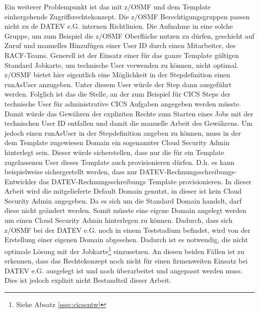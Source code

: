 Ein weiterer Problempunkt ist das mit z/OSMF und dem Template einhergehende Zugriffsrechtekonzept.
Die z/OSMF Berechtigungsgruppen passen nicht zu de DATEV e.G. internen Richtlinien.
Die Aufnahme in eine solche Gruppe, um zum Beispiel die z/OSMF Oberfläche nutzen zu dürfen, geschieht auf Zuruf und manuelles Hinzufügen einer User ID durch einen Mitarbeiter, des RACF-Teams.
Generell ist der Einsatz einer für das ganze Template gültigen Standard Jobkarte, um technische User verwenden zu können, nicht optimal.
z/OSMF bietet hier eigentlich eine Möglichkeit in der Stepdefinition einen \glqq runAsUser\grqq{} anzugeben.
Unter diesem User würde der Step dann ausgeführt werden.
Folglich ist das die Stelle, an der zum Beispiel für CICS Steps der technische User für administrative CICS Aufgaben angegeben werden müsste.
Damit würde das Gewähren der expliziten Rechte zum Starten eines Jobs mit der technischen User ID entfallen und damit die manuelle Arbeit des \glqq Gewährens\grqq.
Um jedoch  einen \glqq runAsUser\grqq{} in der Stepdefinition angeben zu können, muss in der dem Template zugewiesen \glqq Domain\grqq{} ein sogenannter \glqq Cloud Security Admin\grqq{} hinterlegt sein.
Dieser würde sicherstellen, dass nur die für ein Template zugelassenen User dieses Template auch provisionieren dürfen.
D.h. es kann beispielweise sichergestellt werden, dass nur DATEV-Rechnungsschreibungs-Entwickler das DATEV-Rechnungsschreibungs Template provisionieren.
In dieser Arbeit wird die mitgelieferte \glqq Default Domain\grqq{} genutzt, in dieser ist kein \glqq Cloud Security Admin\grqq{} angegeben.
Da es sich um die Standard \glqq Domain\grqq{} handelt, darf diese nicht geändert werden.
Somit müsste eine eigene \glqq Domain\grqq{} angelegt werden um einen \glqq Cloud Security Admin\grqq{} hinterlegen zu können.
Dadurch, dass sich z/OSMF bei der DATEV e.G. noch in einem Teststadium befindet, wird von der Erstellung einer eigenen \glqq Domain\grqq{} abgesehen.
Dadurch ist es notwendig, die nicht optimale Lösung mit der Jobkarte\footnote{Siehe Absatz \ref{ssec:cicsentw}} einzusetzen.
An diesen beiden Fällen ist zu erkennen, dass das Rechtekonzept noch nicht für einen firmenweiten Einsatz bei DATEV e.G. ausgelegt ist und noch überarbeitet und angepasst werden muss.
Dies ist jedoch explizit nicht Bestandteil dieser Arbeit.


 
